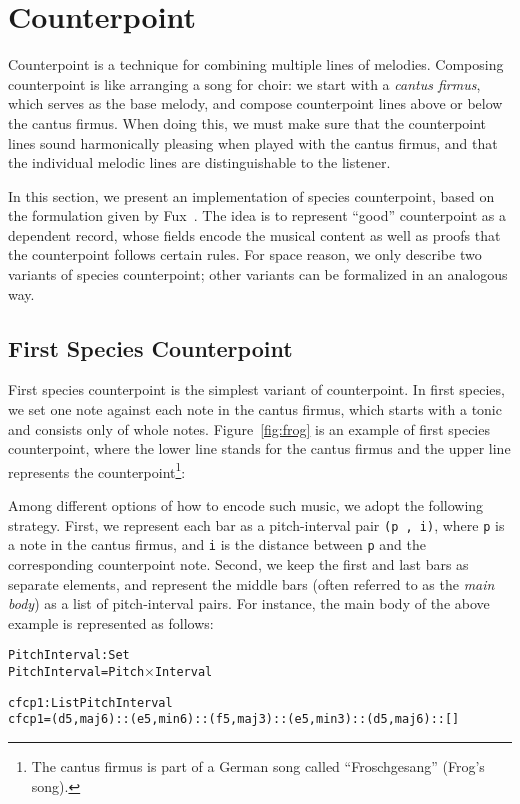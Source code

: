 \section{Counterpoint}
\label{sec:cp}

Counterpoint is a technique for combining multiple lines of melodies.
Composing counterpoint is like arranging a song for choir:
we start with a \emph{cantus firmus}, which serves as the base melody,
and compose counterpoint lines above or below the cantus firmus.
When doing this, we must make sure that the counterpoint lines sound
harmonically pleasing when played with the cantus firmus,
and that the individual melodic lines are distinguishable to the listener.

In this section, we present an implementation of species counterpoint,
based on the formulation given by Fux~\citep{fux-cp}.
The idea is to represent ``good'' counterpoint  as a dependent record,
whose fields encode the musical content as well as proofs that the
counterpoint follows certain rules.
For space reason, we only describe two variants of species counterpoint;
other variants can be formalized in an analogous way.

\subsection{First Species Counterpoint}
\label{sec:cp:fs}

First species counterpoint is the simplest variant of counterpoint.
In first species, we set one note against each note in the cantus firmus,
which starts with a tonic and consists only of whole notes.
Figure~\ref{fig:frog} is an example of first species counterpoint,
where the lower line stands for the cantus firmus and the upper line
represents the counterpoint\footnote{The cantus firmus is part of a
  German song called ``Froschgesang'' (Frog's song).}:

Among different options of how to encode such music, we adopt
the following strategy.
First, we represent each bar as a pitch-interval pair \texttt{(p ,  i)},
where \texttt{p} is a note in the cantus firmus, and \texttt{i} is the
distance between \texttt{p} and the corresponding counterpoint note.
Second, we keep the first and last bars as separate elements, and
represent the middle bars (often referred to as the \emph{main body})
as a list of pitch-interval pairs.
For instance, the main body of the above example is represented as
follows:

\begin{alltt}
PitchInterval : Set
PitchInterval = Pitch \(\times\) Interval

cfcp1 : List PitchInterval
cfcp1 = (d 5 , maj6) :: (e 5 , min6) :: (f 5 , maj3) :: (e 5 , min3) :: (d 5 , maj6) :: []
\end{alltt}

